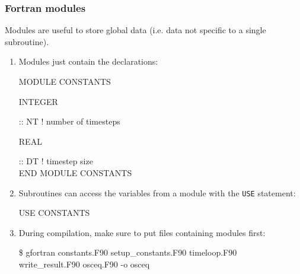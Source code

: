 \documentclass[aspectratio=43,9pt]{beamer}
\begin{document}
\begin{frame}
	\frametitle{Fortran modules}
	Modules are useful to store global data (i.e. data not specific to a single subroutine).
	\begin{enumerate}	
		\item Modules just contain the declarations:
			\par\vspace*{1ex}\hspace*{.05\textwidth}\parbox{.8\textwidth}{\ttfamily\small
				\textcolor{green!80!black}{MODULE} CONSTANTS\\[3ex]
				\parbox{10em}{INTEGER} :: NT\hspace*{3em} ! number of timesteps	\\
				\parbox{10em}{REAL   } :: DT\hspace*{3em} ! timestep size	\\[3ex]
				\textcolor{green!80!black}{END MODULE} CONSTANTS
			}\vspace*{1ex}\par
		\item Subroutines can access the variables from a module with the \texttt{USE} statement:
			\par\vspace*{1ex}\hspace*{.05\textwidth}\parbox{.8\textwidth}{\ttfamily\small
				\textcolor{green!80!black}{USE} CONSTANTS
			}\vspace*{1ex}\par
		\item During compilation, make sure to put files containing modules first:
			\par\vspace*{1ex}\hspace*{.05\textwidth}\parbox{.85\textwidth}{\ttfamily
				\$   gfortran \textcolor{green!80!black}{constants.F90} setup\_constants.F90 timeloop.F90 \string\ \\
				\hspace*{4em}write\_result.F90 osceq.F90 -o osceq
			}\vspace*{1ex}\par		
	\end{enumerate}
\end{frame}
%
%
\end{document}
